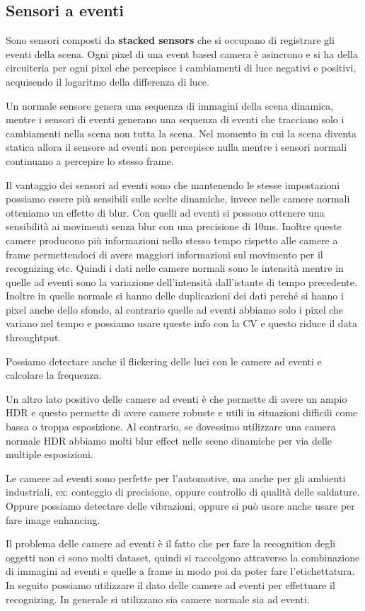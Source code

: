 \subsection{Sensori a eventi}
Sono sensori composti da \textbf{stacked sensors} che si occupano di registrare 
gli eventi della scena. Ogni pixel di una 
event based camera è asincrono e si ha della circuiteria per ogni pixel che percepisce 
i cambiamenti di luce negativi e positivi, acquisendo il logaritmo della differenza 
di luce.

Un normale sensore genera una sequenza di immagini della 
scena dinamica, mentre i sensori di eventi generano una sequenza di eventi che 
tracciano solo i cambiamenti nella scena non tutta la scena. Nel momento in cui la 
scena diventa statica allora il sensore ad eventi non percepisce nulla mentre 
i sensori normali continuano a percepire lo stesso frame. 

Il vantaggio dei sensori ad eventi sono che mantenendo le stesse impostazioni 
possiamo essere più sensibili sulle scelte dinamiche, invece nelle camere normali 
otteniamo un effetto di blur. Con quelli ad eventi si possono ottenere una sensibilità
ai movimenti senza blur con una precisione di 10ms. Inoltre queste camere producono
più informazioni nello stesso tempo rispetto alle camere a frame permettendoci di 
avere maggiori informazioni sul movimento per il recognizing etc. Quindi i dati 
nelle camere normali sono le intensità mentre in quelle ad eventi sono la variazione 
dell'intensità dall'istante di tempo precedente. Inoltre in quelle normale si hanno 
delle duplicazioni dei dati perché si hanno i pixel anche dello sfondo, al contrario 
quelle ad eventi abbiamo solo i pixel che variano nel tempo e possiamo usare queste 
info con la CV e questo riduce il data throughtput. 

\begin{nota}
    Possiamo detectare anche il flickering delle luci con le camere ad eventi e 
    calcolare la frequenza.
\end{nota}

Un altro lato positivo delle camere ad eventi è che permette di avere un ampio HDR 
e questo permette di avere camere robuste e utili in situazioni difficili come 
bassa o troppa esposizione. Al contrario, se dovessimo utilizzare una camera normale 
HDR abbiamo molti blur effect nelle scene dinamiche per via delle multiple esposizioni.
\begin{nota}
    Le camere ad eventi sono perfette per l'automotive, ma anche per gli ambienti 
    industriali, ex: conteggio di precisione, oppure controllo di qualità delle 
    saldature. Oppure possiamo detectare delle vibrazioni, oppure si può usare anche
    usare per fare image enhancing.
\end{nota} 

Il problema delle camere ad eventi è il fatto che per fare la recognition degli oggetti
non ci sono molti dataset, quindi si raccolgono attraverso la combinazione di immagini 
ad eventi e quelle a frame in modo poi da poter fare l'etichettatura. In seguito 
possiamo utilizzare il dato delle camere ad eventi per effettuare il recognizing.
In generale si utilizzano sia camere normale sia ad eventi.
